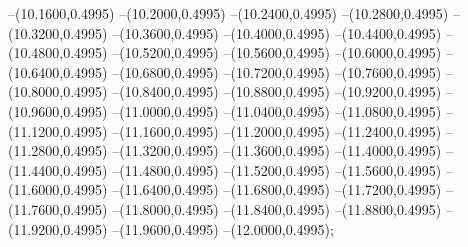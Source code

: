 {	--(10.1600,0.4995)
	--(10.2000,0.4995)
	--(10.2400,0.4995)
	--(10.2800,0.4995)
	--(10.3200,0.4995)
	--(10.3600,0.4995)
	--(10.4000,0.4995)
	--(10.4400,0.4995)
	--(10.4800,0.4995)
	--(10.5200,0.4995)
	--(10.5600,0.4995)
	--(10.6000,0.4995)
	--(10.6400,0.4995)
	--(10.6800,0.4995)
	--(10.7200,0.4995)
	--(10.7600,0.4995)
	--(10.8000,0.4995)
	--(10.8400,0.4995)
	--(10.8800,0.4995)
	--(10.9200,0.4995)
	--(10.9600,0.4995)
	--(11.0000,0.4995)
	--(11.0400,0.4995)
	--(11.0800,0.4995)
	--(11.1200,0.4995)
	--(11.1600,0.4995)
	--(11.2000,0.4995)
	--(11.2400,0.4995)
	--(11.2800,0.4995)
	--(11.3200,0.4995)
	--(11.3600,0.4995)
	--(11.4000,0.4995)
	--(11.4400,0.4995)
	--(11.4800,0.4995)
	--(11.5200,0.4995)
	--(11.5600,0.4995)
	--(11.6000,0.4995)
	--(11.6400,0.4995)
	--(11.6800,0.4995)
	--(11.7200,0.4995)
	--(11.7600,0.4995)
	--(11.8000,0.4995)
	--(11.8400,0.4995)
	--(11.8800,0.4995)
	--(11.9200,0.4995)
	--(11.9600,0.4995)
	--(12.0000,0.4995);
}
